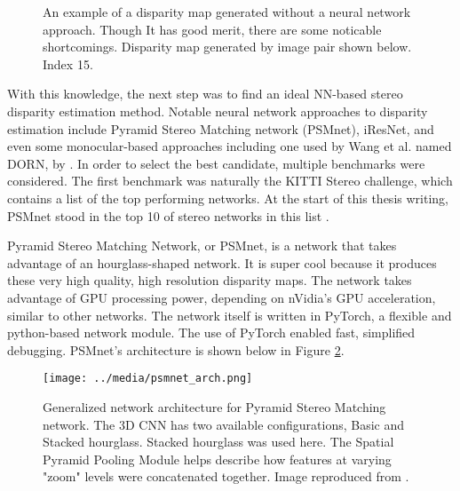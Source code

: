 \begin{figure}[h]
    \centering
    \caption{An example of a disparity map generated without a neural network approach. Though It has good merit, there are some noticable shortcomings. Disparity map generated by image pair shown below. Index 15.}
    \label{ind15_SGBM_comparison}
\end{figure}


With this knowledge, the next step was to find an ideal NN-based stereo disparity estimation method. Notable neural network approaches to disparity estimation include Pyramid Stereo Matching network (PSMnet),  iResNet, and even some monocular-based approaches including one used by Wang et al. named DORN, by  \cite{DBLP:journals/corr/abs-1806-02446}. In order to select the best candidate, multiple benchmarks were considered. The first benchmark was naturally the KITTI Stereo challenge, which contains a list of the top performing networks. At the start of this thesis writing, PSMnet stood in the top 10 of stereo networks in this list \cite{menze_kitti_2019}. 

Pyramid Stereo Matching Network, or PSMnet, is a network that takes advantage of an hourglass-shaped network. It is super cool because it produces these very high quality, high resolution disparity maps. The network takes advantage of GPU processing power, depending on nVidia's GPU acceleration, similar to other networks. The network itself is written in PyTorch, a flexible and python-based network module. The use of PyTorch enabled fast, simplified debugging. PSMnet's architecture is shown below in Figure \ref{psmnet_arch}. 


\begin{figure}[h]
    \texttt{[image: ../media/psmnet\_arch.png]}
    \caption{Generalized network architecture for Pyramid Stereo Matching network. The 3D CNN has two available configurations, Basic and Stacked hourglass. Stacked hourglass was used here. The Spatial Pyramid Pooling Module helps describe how features at varying "zoom" levels were concatenated together. Image reproduced from \cite{chang_pyramid_2018}.}
    \label{psmnet_arch} 
\end{figure}

